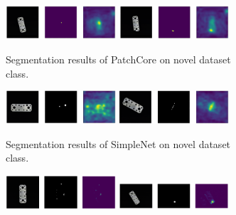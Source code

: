 
\begin{figure}[htbp]
    \centering
    \begin{subfigure}[b]{\textwidth}
        \includegraphics[width=0.45\textwidth]{figures/allapproachesFCimages/patchcore_flat_connector_test_logical_anomalies_023.png}
        \includegraphics[width=0.45\textwidth]{figures/allapproachesFCimages/patchcore_flat_connector_test_structural_anomalies_014.png}
        \caption{Segmentation results of PatchCore \cite{patchCore2022} on novel dataset class.}
    \end{subfigure}
    \hfill
    \begin{subfigure}[b]{\textwidth}
        \includegraphics[width=0.45\textwidth]{figures/allapproachesFCimages/simplenet_flat_connector_test_logical_anomalies_004.png}
        \includegraphics[width=0.45\textwidth]{figures/allapproachesFCimages/simplenet_flat_connector_test_structural_anomalies_016.png}
        \caption{Segmentation results of SimpleNet \cite{liu2023simplenet} on novel dataset class.}
    \end{subfigure}
    \hfill
    \begin{subfigure}[b]{\textwidth}
        \includegraphics[width=0.45\textwidth]{figures/allapproachesFCimages/DRAEM_structural_26.png}
        \includegraphics[width=0.45\textwidth]{figures/allapproachesFCimages/DRAEM_logical_image_40.png}

\end{subfigure}
\end{figure}
